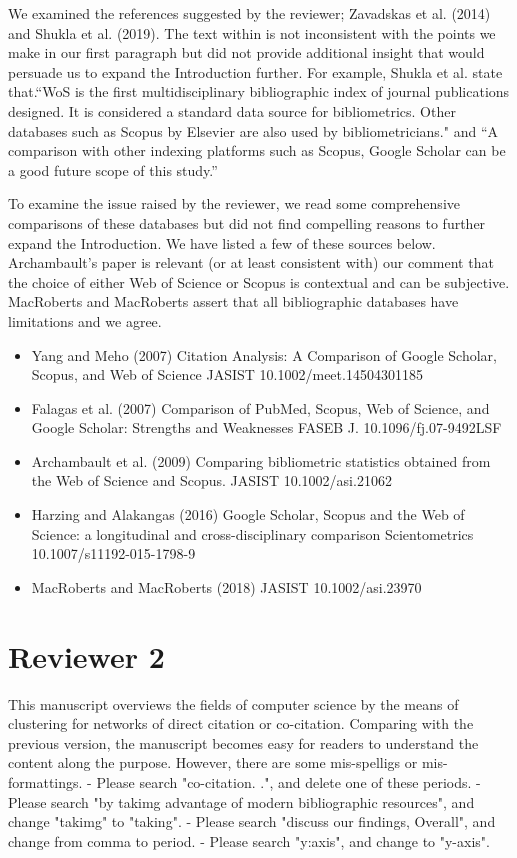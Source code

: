 \documentclass[11pt, oneside]{article}   	%
\begin{document}
\begin{enumerate}
We examined the references suggested by the reviewer; Zavadskas et al. (2014) and Shukla et al. (2019). The text within is not inconsistent with the points we make in our first paragraph but did not 
provide additional insight that would persuade us to expand the Introduction further. For example, Shukla et al. state that.``WoS is the first multidisciplinary bibliographic index of journal publications designed. 
It is considered a standard data source for bibliometrics. Other databases such as Scopus by Elsevier are also used by bibliometricians." and ``A comparison with other indexing platforms such as Scopus, 
Google Scholar can be a good future scope of this study.''

To examine the issue raised by the reviewer, we read some comprehensive comparisons of these databases but did not find compelling reasons to further expand the Introduction. We have listed a few 
of these sources below. Archambault's paper is relevant (or at least consistent with) our comment that the choice of either Web of Science or Scopus is contextual and can be subjective. 
MacRoberts and MacRoberts assert that all bibliographic databases have limitations and we agree. 

\begin{itemize}
\item Yang and Meho (2007) Citation Analysis: A Comparison of Google Scholar, Scopus, and Web of Science JASIST 10.1002/meet.14504301185
\item Falagas et al. (2007) Comparison of PubMed, Scopus, Web of Science, and Google Scholar: Strengths and Weaknesses FASEB J. 10.1096/fj.07-9492LSF
\item Archambault et al. (2009)  Comparing bibliometric statistics obtained from the Web of Science and Scopus. JASIST  10.1002/asi.21062
\item Harzing and Alakangas (2016) Google Scholar, Scopus and the Web of Science: a longitudinal and cross-disciplinary comparison Scientometrics 10.1007/s11192-015-1798-9
\item MacRoberts and MacRoberts (2018) JASIST 10.1002/asi.23970
\end{itemize}
\end{enumerate}


\section*{Reviewer 2} 

This manuscript overviews the fields of computer science by the means of clustering for networks of direct citation or co-citation. Comparing with the previous version, the manuscript 
becomes easy for readers to understand the content along the purpose. However, there are some mis-spelligs or mis-formattings.
- Please search "co-citation. .", and delete one of these periods.
- Please search "by takimg advantage of modern bibliographic resources", and change "takimg" to "taking".
- Please search "discuss our findings, Overall", and change from comma to period.
- Please search "y:axis", and change to "y-axis".
\end{document}
